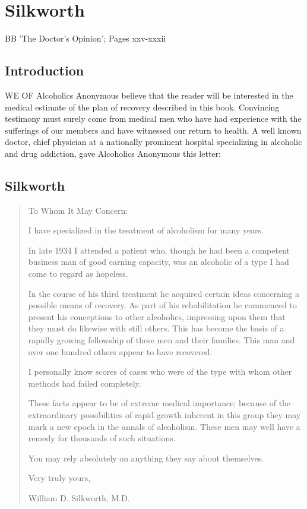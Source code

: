 \chapter{Silkworth}

BB 'The Doctor's Opinion'; Pages xxv-xxxii

\section{Introduction}

WE OF Alcoholics Anonymous believe that the reader will be interested in the medical estimate of the plan of recovery described in this book. 
Convincing testimony must surely come from medical men who have had experience with the sufferings of our members and have witnessed our return to health. 
A well known doctor, chief physician at a nationally prominent hospital specializing in alcoholic and drug addiction, gave Alcoholics Anonymous this letter:


\section{Silkworth}

\begin{quote}
To Whom It May Concern:

I have specialized in the treatment of alcoholism for many years.

In late 1934 I attended a patient who, though he had been a competent business man of good earning capacity, was an alcoholic of a type I had come to regard as hopeless.

In the course of his third treatment he acquired certain ideas concerning a possible means of recovery. 
As part of his rehabilitation he commenced to present his conceptions to other alcoholics, impressing upon them that they must do likewise with still others. 
This has become the basis of a rapidly growing fellowship of these men and their families. This man and over one hundred others appear to have recovered.

I personally know scores of cases who were of the type with whom other methods had failed completely.

These facts appear to be of extreme medical importance; 
because of the extraordinary possibilities of rapid growth inherent in this group they may mark a new epoch in the annals of alcoholism. 
These men may well have a remedy for thousands of such situations.

You may rely absolutely on anything they say about themselves.

Very truly yours, 

William D. Silkworth, M.D.
\end{quote}


